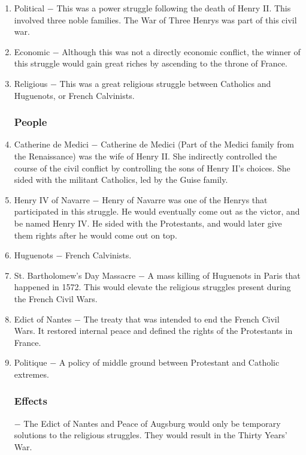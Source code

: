 \documentclass[12pt]{article}
\begin{document}
\begin{enumerate}
\item Political $-$ This was a power struggle following the death of Henry II. This involved three noble families. The War of Three Henrys was part of this civil war.

\item Economic $-$ Although this was not a directly economic conflict, the winner of this struggle would gain great riches by ascending to the throne of France. 

\item Religious $-$ This was a great religious struggle between Catholics and Huguenots, or French Calvinists.

\subsubsection{People}

\item Catherine de Medici $-$ Catherine de Medici (Part of the Medici family from the Renaissance) was the wife of Henry II. She indirectly controlled the course of the civil conflict by controlling the sons of Henry II's choices. She sided with the militant Catholics, led by the Guise family.

\item Henry IV of Navarre $-$ Henry of Navarre was one of the Henrys that participated in this struggle. He would eventually come out as the victor, and be named Henry IV. He sided with the Protestants, and would later give them rights after he would come out on top.

\item Huguenots $-$ French Calvinists.

\item St. Bartholomew's Day Massacre $-$ A mass killing of Huguenots in Paris that happened in 1572. This would elevate the religious struggles present during the French Civil Wars.

\item Edict of Nantes $-$ The treaty that was intended to end the French Civil Wars. It restored internal peace and defined the rights of the Protestants in France. 

\item Politique $-$ A policy of middle ground between Protestant and Catholic extremes.

\subsubsection{Effects} $-$ The Edict of Nantes and Peace of Augsburg would only be temporary solutions to the religious struggles. They would result in the Thirty Years' War.


\end{enumerate}
\end{document}
